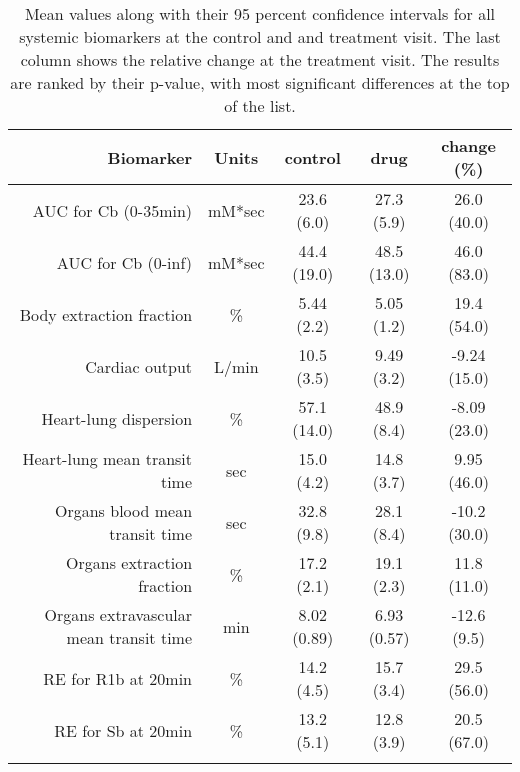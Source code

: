 \documentclass{epflreport}%
\begin{document}
\begin{longtable}{rcccc}%
\hline%
Biomarker&Units&control&drug&change (\%)\\%
\hline%
AUC for Cb (0{-}35min)&mM*sec&23.6 (6.0) &27.3 (5.9) &26.0 (40.0) \\%
AUC for Cb (0{-}inf)&mM*sec&44.4 (19.0) &48.5 (13.0) &46.0 (83.0) \\%
Body extraction fraction&\%&5.44 (2.2) &5.05 (1.2) &19.4 (54.0) \\%
Cardiac output&L/min&10.5 (3.5) &9.49 (3.2) &{-}9.24 (15.0) \\%
Heart{-}lung dispersion&\%&57.1 (14.0) &48.9 (8.4) &{-}8.09 (23.0) \\%
Heart{-}lung mean transit time&sec&15.0 (4.2) &14.8 (3.7) &9.95 (46.0) \\%
Organs blood mean transit time&sec&32.8 (9.8) &28.1 (8.4) &{-}10.2 (30.0) \\%
Organs extraction fraction&\%&17.2 (2.1) &19.1 (2.3) &11.8 (11.0) \\%
Organs extravascular mean transit time&min&8.02 (0.89) &6.93 (0.57) &{-}12.6 (9.5) \\%
RE for R1b at 20min&\%&14.2 (4.5) &15.7 (3.4) &29.5 (56.0) \\%
RE for Sb at 20min&\%&13.2 (5.1) &12.8 (3.9) &20.5 (67.0) \\%
\hline%
\caption{Mean values along with their 95 percent confidence intervals for all systemic biomarkers at the control and and treatment visit. The last column shows the relative change at the treatment visit. The results are ranked by their p-value, with most significant differences at the top of the list.} \\%
\end{longtable}%
\end{document}
